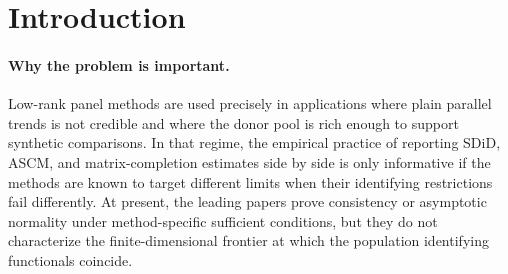 \documentclass[11pt]{article}
\theoremstyle{definition}
\theoremstyle{plain}
\theoremstyle{remark}
\begin{document}
\begin{abstract}
Synthetic difference-in-differences, augmented synthetic control, and nuclear-norm matrix completion are often motivated by the same low-rank interactive fixed-effects model, but the literature does not give a sharp condition under which they define the same ATT functional or the same first-order estimator.  This proposal asks whether equality is governed by an observable finite-dimensional spectral certificate built from donor pre-period covariances, cohort-time regression contrasts, regularization strengths, and the matrix-completion subgradient block.  The flagship conjecture is a necessary-and-sufficient rank/span theorem: the ATT-residual certificate vanishes on the rank-\(R\) tangent cone exactly when SDiD, ASCM, MC, and staggered SDiD identify the same ATT, have the same influence function, and attain the same semiparametric variance bound.  A companion conjecture states that, outside the equality frontier, the first-order bias and influence-function directions differ in a computable way rather than merely producing different finite-sample algorithms.  Resolving the conjecture would give applied researchers a pre-analysis diagnostic for when SDiD, ASCM, and matrix completion are genuine robustness checks rather than three implementations of the same identifying restriction.
\end{abstract}

\section{Introduction}
\paragraph{Why the problem is important.}
Low-rank panel methods are used precisely in applications where plain parallel trends is not credible and where the donor pool is rich enough to support synthetic comparisons.  In that regime, the empirical practice of reporting SDiD, ASCM, and matrix-completion estimates side by side is only informative if the methods are known to target different limits when their identifying restrictions fail differently.  At present, the leading papers prove consistency or asymptotic normality under method-specific sufficient conditions, but they do not characterize the finite-dimensional frontier at which the population identifying functionals coincide.
\end{document}
